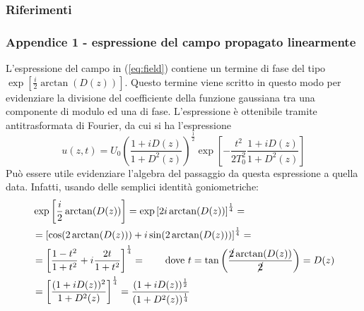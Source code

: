 \documentclass[8pt]{beamer} %
\begin{document}
\begin{frame}
	\frametitle{Riferimenti}
	\printbibliography
\end{frame}

\begin{frame}[plain]
	\frametitle{Appendice 1 - espressione del campo propagato linearmente}
	L'espressione del campo in (\ref{eq:field}) contiene un termine di fase del tipo $\exp\left[\frac{i}{2} \arctan(D(z)) \right]$. Questo termine viene scritto in questo modo per evidenziare la divisione del coefficiente della funzione gaussiana tra una componente di modulo ed una di fase. L'espressione è ottenibile tramite antitrasformata di Fourier, da cui si ha l'espressione
	\begin{equation}
		u(z, t) = U_0 \left(\dfrac{1+iD(z)}{1+D^2(z)}\right)^{\frac{1}{2}} \exp\left[-\dfrac{t^2}{2T_0^2} \dfrac{1+iD(z)}{1+D^2(z)}\right]
	\end{equation}
	Può essere utile evidenziare l'algebra del passaggio da questa espressione a quella data. Infatti, usando delle semplici identità goniometriche:
	\begin{align*}
		&  \exp\left[ \dfrac{i}{2} \arctan(D(z))\right] = \exp\left[ 2i \arctan(D(z))\right]^{\frac{1}{4}}=\\
		&  =\left[\cos(2\arctan(D(z))) + i \sin(2\arctan(D(z)))\right]^{\frac{1}{4}}=	\\
		&  =\left[\dfrac{1-t^2}{1+t^2} + i \dfrac{2t}{1+t^2}\right]^{\frac{1}{4}}  =  \qquad \text{dove $t=\tan\left(\dfrac{\cancel{2}\arctan(D(z))}{\cancel{2}}\right) = D(z)$} \\
		& = \left[\dfrac{(1+iD(z))^2}{1+D^2(z)}\right]^{\frac{1}{4}} = \dfrac{(1+iD(z))^{\frac{1}{2}}}{(1+D^2(z))^{\frac{1}{4}}}
	\end{align*}
\end{frame}

\end{document}
